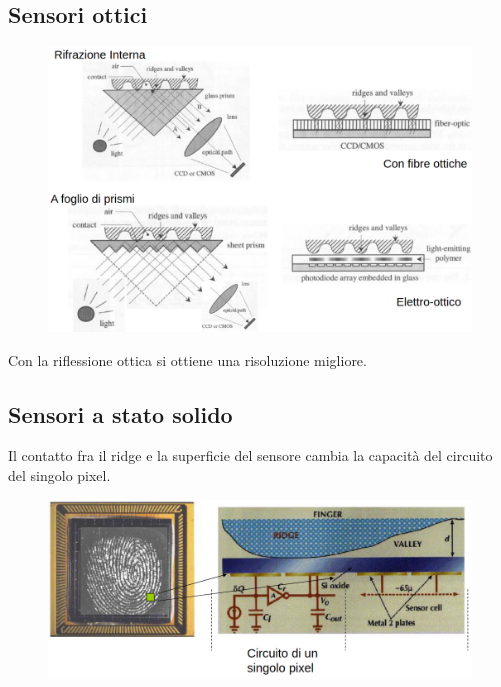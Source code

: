 \subsection{Sensori ottici}

\begin{figure}[ht]
    \centering
    \includegraphics[width=1\linewidth]{chapters/images-chap5/ottici.png}
\end{figure}

\noindent Con la riflessione ottica si ottiene una risoluzione migliore.

\subsection{Sensori a stato solido}

Il contatto fra il ridge e la superficie del sensore cambia la capacità
del circuito del singolo pixel.

\begin{figure}[ht]
    \centering
    \includegraphics[width=1\linewidth]{chapters/images-chap5/statosolido.png}
\end{figure}

